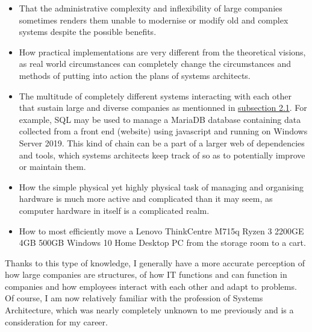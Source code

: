 \begin{itemize}
    \item That the administrative complexity and inflexibility of large
          companies sometimes renders them unable to modernise or modify old and
          complex systems despite the possible benefits.
    \item How practical implementations are very different from the theoretical
          visions, as real world circumstances can completely change the
          circumstances and methods of putting into action the plans of systems
          architects.
    \item The multitude of completely different systems interacting with each
          other that sustain large and diverse companies as mentionned in
          \hyperlink{subsection.2.1}{subsection 2.1}. For example, SQL may be
          used to manage a MariaDB database containing data collected from a
          front end (website) using javascript and running on Windows Server
          2019. This kind of chain can be a part of a larger web of dependencies
          and tools, which systems architects keep track of so as to potentially
          improve or maintain them.
    \item How the simple physical yet highly physical task of managing and
          organising hardware is much more active and complicated than it may
          seem, as computer hardware in itself is a complicated realm.
    \item How to most efficiently move a Lenovo ThinkCentre M715q Ryzen 3 2200GE
          4GB 500GB Windows 10 Home Desktop PC from the storage room to a cart.
\end{itemize}

Thanks to this type of knowledge, I generally have a more accurate perception of
how large companies are structures, of how IT functions and can function in
companies and how employees interact with each other and adapt to problems. Of
course, I am now relatively familiar with the profession of Systems
Architecture, which was nearly completely unknown to me previously and is a
consideration for my career.

